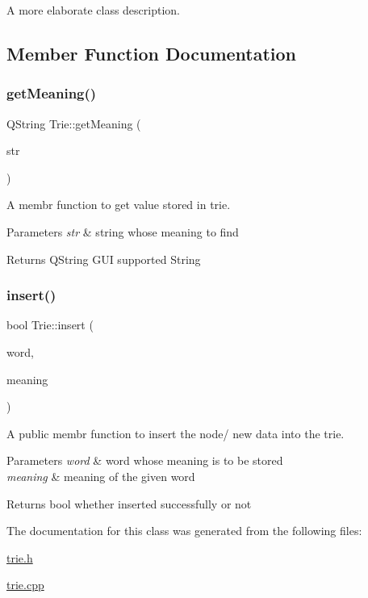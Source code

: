 A more elaborate class description. 

\subsection{Member Function Documentation}
\mbox{\label{classTrie_a109938f88ed193f5e269d99d8d1931ca}} 
\subsubsection{\texorpdfstring{get\+Meaning()}{getMeaning()}}
{\footnotesize\ttfamily Q\+String Trie\+::get\+Meaning (\begin{DoxyParamCaption}\item[{Q\+String}]{str }\end{DoxyParamCaption})\hspace{0.3cm}{\ttfamily [inline]}}



A membr function to get value stored in trie. 


\begin{DoxyParams}{Parameters}
{\em str} & string whose meaning to find \\
\hline
\end{DoxyParams}
\begin{DoxyReturn}{Returns}
Q\+String G\+UI supported String 
\end{DoxyReturn}
\mbox{\label{classTrie_a504580e3f2302333ec5f0bbfbb7d72b9}} 
\subsubsection{\texorpdfstring{insert()}{insert()}}
{\footnotesize\ttfamily bool Trie\+::insert (\begin{DoxyParamCaption}\item[{Q\+String}]{word,  }\item[{Q\+String}]{meaning }\end{DoxyParamCaption})\hspace{0.3cm}{\ttfamily [inline]}}



A public membr function to insert the node/ new data into the trie. 


\begin{DoxyParams}{Parameters}
{\em word} & word whose meaning is to be stored \\
\hline
{\em meaning} & meaning of the given word \\
\hline
\end{DoxyParams}
\begin{DoxyReturn}{Returns}
bool whether inserted successfully or not 
\end{DoxyReturn}


The documentation for this class was generated from the following files\+:\begin{DoxyCompactItemize}
\item 
\hyperlink{trie_8h}{trie.\+h}\item 
\hyperlink{trie_8cpp}{trie.\+cpp}\end{DoxyCompactItemize}
